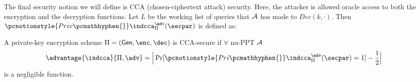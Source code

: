 

\begin{comment}
\begin{definition}[$\pcnotionstyle{Priv\pcmathhyphen{}}\indcpa$] A private-key encryption scheme $\Pi = (\gen,\enc,\dec)$ is $\pcnotionstyle{Priv\pcmathhyphen{}}\indcpa$-secure if 
$$ \advantage{\indcpa}{\Pi,\adv} = \Large\mid \Pr[\pcnotionstyle{Priv\pcmathhyphen{}}\indcpa_\Pi^\adv(\secpar) =1] -\frac12\Large\mid$$
is a negligible function. 
\end{definition}    
The main difference is when the key $k$ is sampled.
In the first definition, $m_0$ and $m_1$ are fixed before $k$ is sampled,
whereas in the second definition, $k$ is sampled before $m_0$ and $m_1$ are fixed.
\end{comment}



The final security notion we will define is CCA (chosen-ciphertext attack) security.
Here, the attacker is allowed oracle access to both the encryption and the decryption functions.
Let $L$ be the working list of queries that $\mathcal{A}$ has made to $Dec(k, \cdot)$.
Then $\pcnotionstyle{Priv\pcmathhyphen{}}\indcca_{\Pi}^{\adv}(\secpar)$ is defined as:

\begin{definition}
    A private-key encryption scheme $\Pi = (\gen,\enc,\dec)$ is CCA-secure if $\forall$ nu-PPT $\mathcal{A}$
    $$\advantage{\indcca}{\Pi,\adv} = \Big| \Pr[\pcnotionstyle{Pri\pcmathhyphen{}}\indcca_\Pi^\adv(\secpar) =1] -\frac12\Big|$$
    is a negligible function.
\end{definition}

